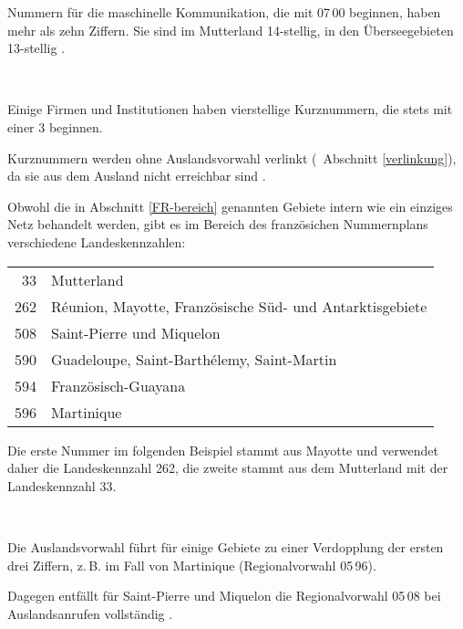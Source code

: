 \documentclass[numbers=noenddot]{scrreprt}
\newcommand*\vglAbschnitt[1]{(\cf\ Abschnitt \ref{#1})}
\begin{document}
Nummern für die maschinelle Kommunikation, die mit 07\,00 beginnen, haben mehr als zehn Ziffern. Sie sind im Mutterland 14-stellig, in den Überseegebieten 13-stellig \cite[18]{ARCEP}.
\begin{sidebyside}
   \\
\end{sidebyside}

Einige Firmen und Institutionen haben vierstellige Kurznummern, die stets mit einer 3 beginnen.
\begin{sidebyside}
\end{sidebyside}
Kurznummern werden ohne Auslandsvorwahl verlinkt
\vglAbschnitt{verlinkung}, da sie aus dem Ausland nicht erreichbar sind \cite[26]{ARCEP}.

Obwohl die in Abschnitt \ref{FR-bereich} genannten Gebiete intern wie ein einziges Netz behandelt werden, gibt es im Bereich des französichen Nummernplans verschiedene Landeskennzahlen:
\begin{center}
\begin{tabular}{rl}
33 & Mutterland \\
262 & R\'eunion, Mayotte, Französische Süd- und Antarktisgebiete \\
508 & Saint-Pierre und Miquelon \\
590 & Guadeloupe, Saint-Barth\'elemy, Saint-Martin \\
594 & Französisch-Guayana \\
596 & Martinique \\
\end{tabular}
\end{center}
Die erste Nummer im folgenden Beispiel stammt aus Mayotte und verwendet daher die Landeskennzahl 262, die zweite stammt aus dem Mutterland mit der Landeskennzahl 33.
\begin{sidebyside}
   \\
\end{sidebyside}

Die Auslandsvorwahl führt für einige Gebiete zu einer Verdopplung der ersten drei Ziffern, z.\,B. im Fall von Martinique (Regionalvorwahl 05\,96).
\begin{sidebyside}
\end{sidebyside}
Dagegen entfällt für Saint-Pierre und Miquelon die Regionalvorwahl 05\,08 bei Auslandsanrufen vollständig \cite[13]{ARCEP}.
\begin{sidebyside}
\end{sidebyside}
\end{document}
